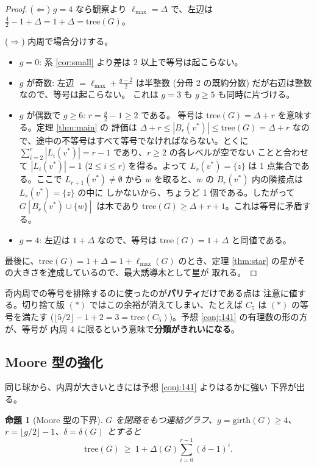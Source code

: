 \documentclass[paper=a4,fontsize=10.5pt,jafontsize=10.5pt]{jlreq}
\theoremstyle{plain}
\newtheorem{proposition}[theorem]{命題}
\theoremstyle{definition}
\begin{document}
\begin{proof}
($\Leftarrow$) $g = 4$ なら観察より $\ell_{\max} = \Delta$ で、左辺は
$\tfrac{4}{2} - 1 + \Delta = 1 + \Delta = \mathrm{tree}(G)$。

($\Rightarrow$) 内周で場合分けする。
\begin{itemize}
\item $g = 0$: 系 \ref{cor:small} より差は $2$ 以上で等号は起こらない。
\item $g$ が奇数: 左辺 $= \ell_{\max} + \tfrac{g-2}{2}$ は半整数
  (分母 2 の既約分数) だが右辺は整数なので、等号は起こらない。
  これは $g = 3$ も $g \ge 5$ も同時に片づける。
\item $g$ が偶数で $g \ge 6$: $r = \tfrac{g}{2} - 1 \ge 2$ である。
  等号は $\mathrm{tree}(G) = \Delta + r$ を意味する。定理 \ref{thm:main} の
  評価は
  $\Delta + r \le |B_r(v^*)| \le \mathrm{tree}(G) = \Delta + r$
  なので、途中の不等号はすべて等号でなければならない。とくに
  $\sum_{i=2}^{r} |L_i(v^*)| = r - 1$ であり、$r \ge 2$ の各レベルが空でない
  ことと合わせて $|L_i(v^*)| = 1$ ($2 \le i \le r$) を得る。よって
  $L_r(v^*) = \{z\}$ は 1 点集合である。ここで $L_{r+1}(v^*) \ne \emptyset$
  から $w$ を取ると、$w$ の $B_r(v^*)$ 内の隣接点は $L_r(v^*) = \{z\}$ の中に
  しかないから、ちょうど 1 個である。したがって
  $G[B_r(v^*) \cup \{w\}]$ は木であり
  $\mathrm{tree}(G) \ge \Delta + r + 1$。これは等号に矛盾する。
\item $g = 4$: 左辺は $1 + \Delta$ なので、等号は
  $\mathrm{tree}(G) = 1 + \Delta$ と同値である。
\end{itemize}
最後に、$\mathrm{tree}(G) = 1 + \Delta = 1 + \ell_{\max}(G)$ のとき、定理
\ref{thm:star} の星がその大きさを達成しているので、最大誘導木として星が
取れる。
\end{proof}

奇内周での等号を排除するのに使ったのが\textbf{パリティ}だけである点は
注意に値する。切り捨て版 $(\ast)$ ではこの余裕が消えてしまい、たとえば
$C_5$ は $(\ast)$ の等号を満たす ($\lfloor 5/2 \rfloor - 1 + 2 = 3 =
\mathrm{tree}(C_5)$)。予想 \ref{conj:141} の有理数の形の方が、等号が
内周 4 に限るという意味で\textbf{分類がきれいになる}。

\subsection{Moore 型の強化}

同じ球から、内周が大きいときには予想 \ref{conj:141} よりはるかに強い
下界が出る。

\begin{proposition}[Moore 型の下界]\label{prop:moore}
$G$ を閉路をもつ連結グラフ、$g = \mathrm{girth}(G) \ge 4$、
$r = \lfloor g/2 \rfloor - 1$、$\delta = \delta(G)$ とすると
\[ \mathrm{tree}(G) \ \ge \ 1 + \Delta(G) \sum_{i=0}^{r-1} (\delta-1)^i . \]
\end{proposition}
\end{document}
